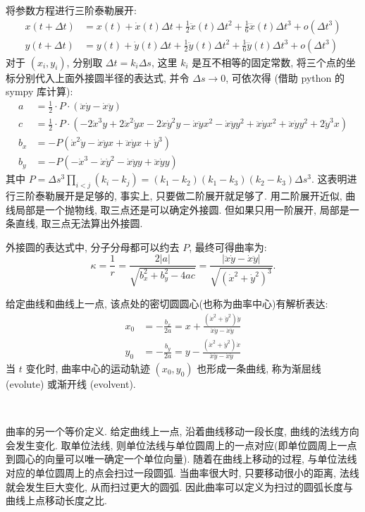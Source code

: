 将参数方程进行三阶泰勒展开:
\begin{align*}
x(t+\Delta t) &= x(t) + \dot{x}(t)\Delta t + \frac{1}{2}\ddot{x}(t)\Delta t^2 + \frac{1}{6}\dddot{x}(t)\Delta t^3 + o(\Delta t^3) \\
y(t+\Delta t) &= y(t) + \dot{y}(t)\Delta t + \frac{1}{2}\ddot{y}(t)\Delta t^2 + \frac{1}{6}\dddot{y}(t)\Delta t^3 + o(\Delta t^3)
\end{align*}
对于 $(x_i, y_i)$, 分别取 $\Delta t = k_i\Delta s$, 这里 $k_i$ 是互不相等的固定常数, 将三个点的坐标分别代入上面外接圆半径的表达式, 并令 $\Delta s\to 0$, 可依次得 (借助 python 的 sympy 库计算):
\begin{align*}
a &= \frac{1}{2}\cdot P\cdot(\ddot{x}\dot{y}-\dot{x}\ddot{y}) \\
c &= \frac{1}{2}\cdot P\cdot(-2\dot{x}^3y + 2\dot{x}^2\dot{y}x - 2\dot{x}\dot{y}^2y - \dot{x}\ddot{y}x^2 - \dot{x}\ddot{y}y^2 + \ddot{x}\dot{y}x^2 + \ddot{x}\dot{y}y^2 + 2\dot{y}^3x)\\
b_x &= -P(\dot{x}^2\dot{y} - \dot{x}\ddot{y}x + \ddot{x}\dot{y}x + \dot{y}^3)\\
b_y &= -P(-\dot{x}^3 - \dot{x}\dot{y}^2 - \dot{x}\ddot{y}y + \ddot{x}\dot{y}y)
\end{align*}
其中 $\displaystyle P = \Delta s^3\prod_{i<j}(k_i - k_j) = (k_1-k_2)(k_1-k_3)(k_2-k_3)\Delta s^3$. 这表明进行三阶泰勒展开是足够的, 事实上, 只要做二阶展开就足够了. 用二阶展开近似, 曲线局部是一个抛物线, 取三点还是可以确定外接圆. 但如果只用一阶展开, 局部是一条直线, 取三点无法算出外接圆.

外接圆的表达式中, 分子分母都可以约去 $P$, 最终可得曲率为:
\[ \kappa = \frac{1}{r} = \frac{2|a|}{\sqrt{b_x^2+b_y^2-4ac}} = \frac{|\ddot{x}\dot{y}-\dot{x}\ddot{y}|}{\sqrt{(\dot{x}^2+\dot{y}^2)^{3}}} .\]

给定曲线和曲线上一点, 该点处的密切圆圆心(也称为曲率中心)有解析表达:
\begin{align*}
x_0 &= -\frac{b_x}{2a} = x + \frac{(\dot{x}^2+\dot{y}^2)\dot{y}}{\ddot{x}\dot{y}-\dot{x}\ddot{y}} \\
y_0 &= -\frac{b_y}{2a} = y - \frac{(\dot{x}^2+\dot{y}^2)\dot{x}}{\ddot{x}\dot{y}-\dot{x}\ddot{y}}
\end{align*}
当 $t$ 变化时, 曲率中心的运动轨迹 $(x_0,y_0)$ 也形成一条曲线, 称为渐屈线 (evolute) 或渐开线 (evolvent). 

~

曲率的另一个等价定义. 给定曲线上一点, 沿着曲线移动一段长度, 曲线的法线方向会发生变化. 取单位法线, 则单位法线与单位圆周上的一点对应(即单位圆周上一点到圆心的向量可以唯一确定一个单位向量). 随着在曲线上移动的过程, 与单位法线对应的单位圆周上的点会扫过一段圆弧. 当曲率很大时, 只要移动很小的距离, 法线就会发生巨大变化, 从而扫过更大的圆弧. 因此曲率可以定义为扫过的圆弧长度与曲线上点移动长度之比.

